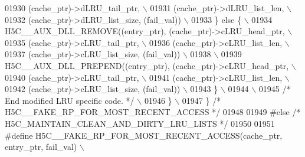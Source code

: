 \begin{DoxyCode}
01930 \textcolor{preprocessor}{                                 (cache\_ptr)->dLRU\_tail\_ptr,                \(\backslash\)}
01931 \textcolor{preprocessor}{                                 (cache\_ptr)->dLRU\_list\_len,                \(\backslash\)}
01932 \textcolor{preprocessor}{                                 (cache\_ptr)->dLRU\_list\_size, (fail\_val))   \(\backslash\)}
01933 \textcolor{preprocessor}{        \} else \{                                                            \(\backslash\)}
01934 \textcolor{preprocessor}{            H5C\_\_AUX\_DLL\_REMOVE((entry\_ptr), (cache\_ptr)->cLRU\_head\_ptr,    \(\backslash\)}
01935 \textcolor{preprocessor}{                                (cache\_ptr)->cLRU\_tail\_ptr,                 \(\backslash\)}
01936 \textcolor{preprocessor}{                                (cache\_ptr)->cLRU\_list\_len,                 \(\backslash\)}
01937 \textcolor{preprocessor}{                                (cache\_ptr)->cLRU\_list\_size, (fail\_val))    \(\backslash\)}
01938 \textcolor{preprocessor}{                                                                            \(\backslash\)}
01939 \textcolor{preprocessor}{            H5C\_\_AUX\_DLL\_PREPEND((entry\_ptr), (cache\_ptr)->cLRU\_head\_ptr,   \(\backslash\)}
01940 \textcolor{preprocessor}{                                 (cache\_ptr)->cLRU\_tail\_ptr,                \(\backslash\)}
01941 \textcolor{preprocessor}{                                 (cache\_ptr)->cLRU\_list\_len,                \(\backslash\)}
01942 \textcolor{preprocessor}{                                 (cache\_ptr)->cLRU\_list\_size, (fail\_val))   \(\backslash\)}
01943 \textcolor{preprocessor}{        \}                                                                   \(\backslash\)}
01944 \textcolor{preprocessor}{                                                                            \(\backslash\)}
01945 \textcolor{preprocessor}{        }\textcolor{comment}{/* End modified LRU specific code. */}\textcolor{preprocessor}{                               \(\backslash\)}
01946 \textcolor{preprocessor}{    \}                                                                       \(\backslash\)}
01947 \textcolor{preprocessor}{\} }\textcolor{comment}{/* H5C\_\_FAKE\_RP\_FOR\_MOST\_RECENT\_ACCESS */}\textcolor{preprocessor}{}
01948 
01949 \textcolor{preprocessor}{#else }\textcolor{comment}{/* H5C\_MAINTAIN\_CLEAN\_AND\_DIRTY\_LRU\_LISTS */}\textcolor{preprocessor}{}
01950 
01951 \textcolor{preprocessor}{#define H5C\_\_FAKE\_RP\_FOR\_MOST\_RECENT\_ACCESS(cache\_ptr, entry\_ptr, fail\_val) \(\backslash\)}

\end{DoxyCode}
